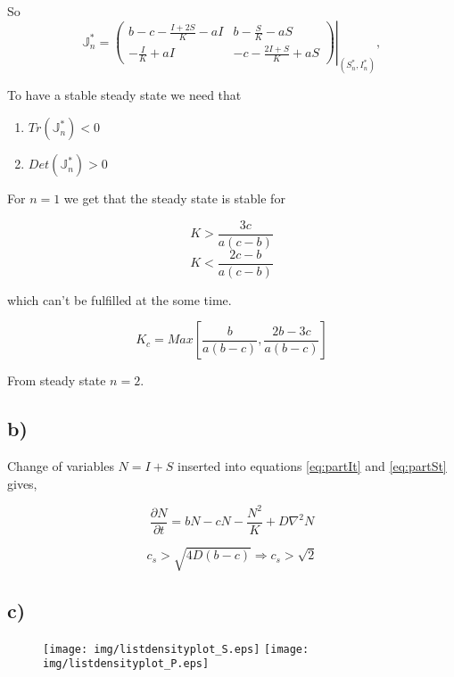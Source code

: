 So
\begin{equation}
\mathbb{J}^*_n=\left.\left(
\begin{array}{cc}
b-c-\frac{I+2S}{K}-aI & b-\frac{S}{K}-aS \\
-\frac{I}{K} +aI & -c -\frac{2I+S}{K}+aS
\end{array}\right)\right|_{(S^*_n,I^*_n)},
\end{equation}

To have a stable steady state we need that 

\begin{enumerate}
\item $Tr(\mathbb{J}^*_n)<0$
\item $Det(\mathbb{J}^*_n)>0$
\end{enumerate}


For $n=1$ we get that the steady state is stable for

$$
K>\frac{3c}{a(c-b)}
$$$$
K<\frac{2c-b}{a(c-b)}
$$

which can't be fulfilled at the some time.


\begin{equation}
K_c=Max\left[\frac{b}{a(b-c)},\frac{2b-3c}{a(b-c)}\right]
\end{equation}

From steady state $n=2$.
\subsection{b)}

Change of variables $N=I+S$ inserted into equations \eqref{eq:partIt} and \eqref{eq:partSt} gives,

\begin{equation}
\frac{\partial N}{\partial t}=bN -cN -\frac{N^2}{K}+D\nabla^2N
\end{equation}

\begin{equation}
c_s>\sqrt{4D(b-c)} \Rightarrow c_s>\sqrt{2}
\end{equation}

\subsection{c)}

\begin{figure}[h]
    \centering
    \texttt{[image: img/listdensityplot\_S.eps]}
    \texttt{[image: img/listdensityplot\_P.eps]}
  \caption{}
\end{figure}
